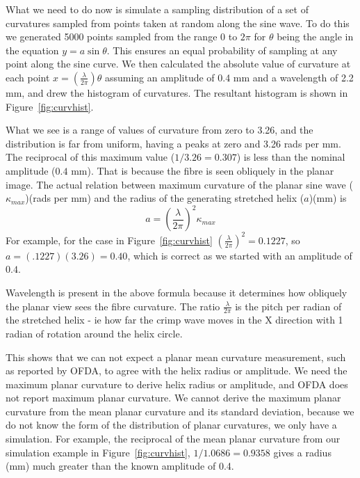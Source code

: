 \documentclass[titlepage,10pt]{article}  %
\begin{document}
What we need to do now is simulate a sampling distribution of a set of curvatures sampled from points taken at random along the sine wave.  To do this we generated 5000 points sampled from the range $0$ to $2\pi$ for $\theta$ being the angle in the equation $y = a \sin{\theta}$. This ensures an equal probability of sampling at any point along the sine curve.  We then calculated the absolute value of curvature at each point $x = \left(\frac{\lambda}{2\pi}\right)\theta$ assuming an amplitude of 0.4 mm and a wavelength of 2.2 mm, and drew the histogram of curvatures.  The resultant histogram is shown in Figure~\ref{fig:curvhist}.

What we see is a range of values of curvature from zero to 3.26, and the distribution is far from uniform, having a peaks at zero and 3.26 rads per mm. The reciprocal of this maximum value ($1/3.26 = 0.307$) is less than the nominal amplitude ($0.4$ mm). That is because the fibre is seen obliquely in the planar image.
The actual relation between maximum curvature of the planar sine wave ($\kappa_{max}$)(rads per mm) and the radius of the generating stretched helix ($a$)(mm) is
\begin{displaymath}
a = \left(\frac{\lambda}{2 \pi}\right)^{2} \kappa_{max}
\end{displaymath}
For example, for the case in Figure~\ref{fig:curvhist} $\left(\frac{\lambda}{2 \pi}\right)^{2} = 0.1227$, so $a = (.1227)(3.26) = 0.40$, which is correct as we started with an amplitude of $0.4$. 

Wavelength is present in the above formula because it determines how obliquely the planar view sees the fibre curvature. The ratio $\frac{\lambda}{2 \pi}$ is the pitch per radian of the stretched helix - ie how far the crimp wave moves in the X direction with 1 radian of rotation around the helix circle. 

This shows that we can  not expect a planar mean curvature measurement, such as reported by OFDA,  to agree with the helix radius or amplitude. We need the maximum planar curvature to derive helix radius or amplitude, and OFDA does not report maximum planar curvature. We cannot derive the maximum planar curvature from the mean planar curvature and its standard deviation, because we do not know the form of the distribution of planar curvatures, we only have a simulation.
 For example, the reciprocal of the mean planar curvature from our simulation example in Figure~\ref{fig:curvhist}, $1/1.0686 = 0.9358$ gives a radius (mm) much greater than the known amplitude of 0.4. 
\end{document}
